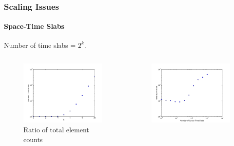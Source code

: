 \documentclass[18pt,xcolor=table]{beamer}
\begin{document}
\begin{frame}
\frametitle{Scaling Issues}
\framesubtitle{Space-Time Slabs}  %
Number of time slabs = $2^k$.
\begin{columns}
\begin{column}{0.5\textwidth}
\begin{figure}
\centering
\includegraphics[width=\textwidth]{Dissertation/Scaling/RatioElementCount.pdf}
\\Ratio of total element counts
\end{figure}
\end{column}
\begin{column}{0.5\textwidth}
\begin{figure}
\centering
\includegraphics[width=\textwidth]{Dissertation/Scaling/TimeSlabSolveTime.pdf}

\end{figure}
\end{column}
\end{columns}
\end{frame}
\end{document}
